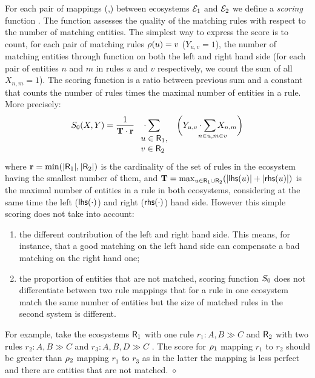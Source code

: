 \documentclass[a4paper,twoside]{article}
\begin{document}
For each pair of mappings (\mapcomp,\maprule) between ecosystems $\mathcal{E}_1$ and $\mathcal{E}_2$ we define a \emph{scoring} function \gf.
The function assesses the quality of the matching rules with respect to the number of matching entities. 
The simplest way to express the score is to count,  for each pair of  matching rules  $\rho(u) =v$ (\ie $Y_{u,v}=1$), the number of matching entities through  function \mapcomp on both the left and right hand side (\ie  for each pair of entities $n$ and $m$  in rules $u$ and $v$ respectively, we count the sum of all  $X_{n,m} =1$). 
The scoring function is a ratio between previous sum and a constant that counts the number of rules times  the maximal  number of entities in a  rule.
More precisely: 
$$  \gf_0(X,Y) = {}
   \frac{1}{\Ti\cdot \rulemax} \phantom{m} \cdot \sum_{\mathclap{\begin{array}{l} u \in \Ru_1, \\ v \in \Ru_2 \end{array}}}    \phantom{mm} \bigg( Y_{u,v} \cdot 
  \sum_{\mathrlap{n \in u, m \in v}} X_{n,m}
  \bigg) 
$$
where 
$ \mathbf{r} = \min (|\mathsf{R}_1|, |\mathsf{R}_2|)$ 
is the cardinality of the set of rules in the ecosystem having the smallest number of them, and
$\mathbf{T} = \max_{u\in \mathsf{R}_1 \cup \mathsf{R}_2} (|\mathsf{lhs}(u)| + |\mathsf{rhs}(u)|)$
is the maximal number of entities in a rule in both ecosystems, considering at the same time the left ($\mathsf{lhs}(\cdot)$) and right ($\mathsf{rhs}(\cdot)$) hand side.
However this simple scoring does not take into account:
\begin{enumerate}
\item the different contribution of the left and right hand side. This means, for instance, that a good matching on the left hand side can compensate a bad matching on the right hand one; 
\item the proportion of entities that are not matched, scoring function $S_0$ does not differentiate between two rule mappings  that for a rule in one ecosystem  match the same number of entities but the size of matched rules in the second system is different.
\end{enumerate}

\begin{example}
For example, take the ecosystems $\mathsf{R}_1$ with one rule ${r_1: A, B \gg C}$ and  $\mathsf{R}_2$ with two rules ${r_2: A, B \gg C}$ and ${r_3: A, B, D \gg C}$ .
The score for $\rho_1$ mapping ${r_1}$ to ${r_2}$ should be greater than $\rho_2$ mapping ${r_1}$ to ${r_3}$ as in the latter the mapping is less perfect and there are entities that are not matched.
\hfill $\diamond$
\end{example}
\end{document}
